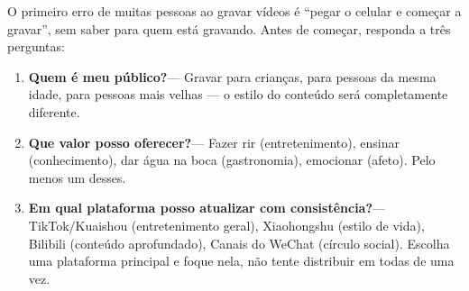 


O primeiro erro de muitas pessoas ao gravar vídeos é “pegar o celular e começar a gravar”, sem saber para quem está gravando. Antes de começar, responda a três perguntas:

\begin{enumerate}
  \item \textbf{Quem é meu público?}— Gravar para crianças, para pessoas da mesma idade, para pessoas mais velhas — o estilo do conteúdo será completamente diferente.
  \item \textbf{Que valor posso oferecer?}— Fazer rir (entretenimento), ensinar (conhecimento), dar água na boca (gastronomia), emocionar (afeto). Pelo menos um desses.
  \item \textbf{Em qual plataforma posso atualizar com consistência?}— TikTok/Kuaishou (entretenimento geral), Xiaohongshu (estilo de vida), Bilibili (conteúdo aprofundado), Canais do WeChat (círculo social). Escolha uma plataforma principal e foque nela, não tente distribuir em todas de uma vez.
\end{enumerate}


